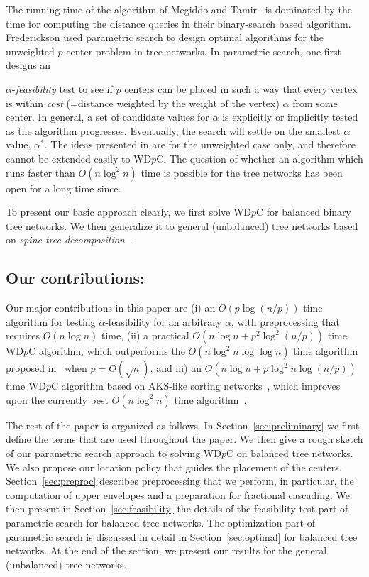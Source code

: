 \documentclass{llncs}
\begin{document}
The running time of the algorithm of Megiddo and Tamir~\cite{megiddo1983c}
is dominated by the time for computing the distance queries in their binary-search based algorithm.
Frederickson \cite{frederickson1990,frederickson1991b} used parametric search
to design optimal algorithms for the unweighted $p$-center problem in tree networks.
In parametric search,
one first designs an {$\alpha$-{\em feasibility} test to see if $p$ centers can be placed
in such a way that every vertex is within {\em cost} (=distance weighted by the weight of the vertex)
$\alpha$ from some center.
In general, a set of candidate values for $\alpha$ is explicitly or implicitly tested
as the algorithm progresses.
Eventually, the search will settle on the smallest $\alpha$ value, $\alpha^*$.
The ideas presented in \cite{frederickson1990,frederickson1991b} are for the unweighted case only,
and therefore cannot be extended easily to WD$p$C.
The question of whether an algorithm which runs faster than $O(n\log^2n)$ time
is possible for the tree networks has been open for a long time since.

To present our basic approach clearly,
we first solve WD$p$C for balanced binary tree networks.
We then generalize it to general (unbalanced) tree networks based on {\em spine tree decomposition}~\cite{benkoczi2004,benkoczi2003}.


\subsection{Our contributions:}
Our major contributions in this paper are
(i) an $O(p\log(n/p))$ time algorithm for testing $\alpha$-feasibility for an arbitrary $\alpha$,
with preprocessing that requires $O(n\log n)$ time,
(ii) a practical $O(n\log n + p^2\log^2(n/p))$ time WD$p$C algorithm,
which outperforms the $O(n\log^2 n\log\log n)$ time algorithm proposed in~\cite{megiddo1983c}
when $p=O(\sqrt{n})$,
and
iii)  an $O(n\log n+p\log^2 n\log(n/p))$ time WD$p$C algorithm based on AKS-like sorting
networks~\cite{ajtai1983,goodrich2014,seiferas2009},
which improves upon the currently best $O(n\log^2n)$ time algorithm~\cite{cole1987,megiddo1983c}.

The rest of the paper is organized as follows.
In Section~\ref{sec:preliminary} we first define the terms that are used throughout the paper.
We then give a rough sketch of our parametric search approach to solving WD$p$C on balanced tree networks.
We also propose our location policy that guides the placement of the centers.
Section~\ref{sec:preproc} describes preprocessing that we perform,
in particular, the computation of upper envelopes and
a preparation for fractional cascading.
We then present in Section~\ref{sec:feasibility} the details of the feasibility test
part of parametric search for balanced tree networks.
The optimization part of parametric search is discussed in detail in Section~\ref{sec:optimal}
for balanced tree networks.
At the end of the section,
we present our results for the general (unbalanced) tree networks.

}
\end{document}
